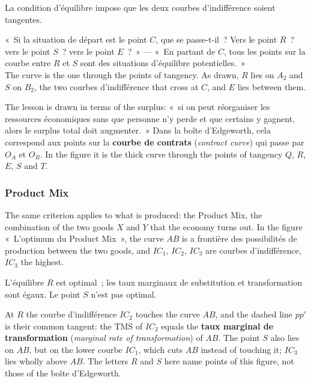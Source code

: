 \begin{prop}
  La condition d'équilibre impose que les deux courbes d'indifférence soient
  tangentes.
\end{prop}

\begin{example}
  «~Si la situation de départ est le point $C$, que se passe-t-il~? Vers le point
  $R$~? vers le point $S$~? vers le point $E$~?~» --- «~En partant de $C$, tous les
  points sur la courbe entre $R$ et $S$ sont des situations d'équilibre
  potentielles.~»\\

  The curve is the one through the points of tangency. As drawn, $R$ lies on $A_2$
  and $S$ on $B_2$, the two courbes d'indifférence that cross at $C$, and $E$ lies
  between them.
\end{example}

The lesson is drawn in terms of the surplus: «~si on peut réorganiser les
ressources économiques sans que personne n'y perde et que certains y gagnent, alors
le surplus total doit augmenter.~» Dans la boîte d'Edgeworth, cela correspond aux
points sur la \textbf{courbe de contrats} (\textit{contract curve}) qui passe par
$O_A$ et $O_B$. In the figure it is the thick curve through the points of tangency
$Q$, $R$, $E$, $S$ and $T$.

\subsubsection{Product Mix}

The same criterion applies to what is produced: the Product Mix, the combination of
the two goods $X$ and $Y$ that the economy turns out. In the figure «~L'optimum du
Product Mix~», the curve $AB$ is a frontière des possibilités de production between
the two goods, and $IC_1$, $IC_2$, $IC_3$ are courbes d'indifférence, $IC_3$ the
highest.

\begin{prop}
  L'équilibre $R$ est optimal~; les taux marginaux de substitution et
  transformation sont égaux. Le point $S$ n'est pas optimal.
\end{prop}

At $R$ the courbe d'indifférence $IC_2$ touches the curve $AB$, and the dashed line
$pp'$ is their common tangent: the TMS of $IC_2$ equals the \textbf{taux marginal de
transformation} (\textit{marginal rate of transformation}) of $AB$. The point $S$
also lies on $AB$, but on the lower courbe $IC_1$, which cuts $AB$ instead of
touching it; $IC_3$ lies wholly above $AB$. The letters $R$ and $S$ here name points
of this figure, not those of the boîte d'Edgeworth.


